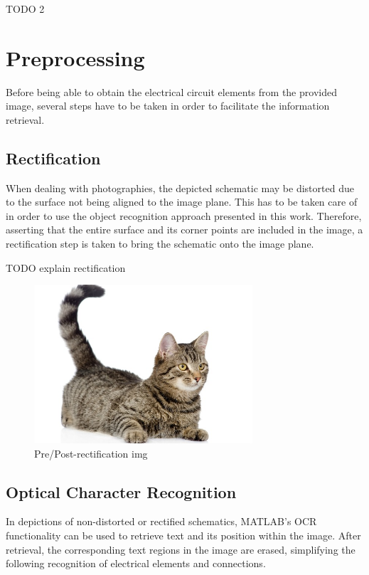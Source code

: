 \documentclass[10pt,twocolumn,letterpaper]{article}
\begin{document}
TODO 2


\section{Preprocessing}
\label{sec:pre}

Before being able to obtain the electrical circuit elements from the provided image, several steps have to be taken in order to facilitate the information retrieval.

\subsection{Rectification}
\label{subsec:rect}

When dealing with photographies, the depicted schematic may be distorted due to the surface not being aligned to the image plane. This has to be taken care of in order to use the object recognition approach presented in this work. Therefore, asserting that the entire surface and its corner points are included in the image, a rectification step is taken to bring the schematic onto the image plane.
\par

TODO explain rectification
\par

\begin{figure}[!ht]
\includegraphics[width = 3.2in]{img/cat.jpg}
\caption{Pre/Post-rectification img}
\label{fig:c5}
\end{figure}

\subsection{Optical Character Recognition}
\label{subsec:ocr}

In depictions of non-distorted or rectified schematics, MATLAB's OCR functionality can be used to retrieve text and its position within the image. After retrieval, the corresponding text regions in the image are erased, simplifying the following recognition of electrical elements and connections.
\par
\end{document}
